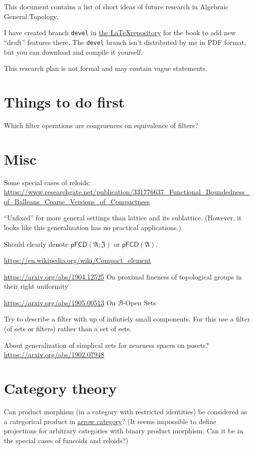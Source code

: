 \documentclass{amsart}
\begin{document}
This document contains a list of short ideas of future research in Algebraic
General Topology.

I have created branch \texttt{devel} in \href{https://bitbucket.org/portonv/algebraic-general-topology}{the \LaTeX repository} for the book
to add new ``draft'' features there. The \texttt{devel} branch isn't distributed by me in PDF format, but you can download and compile it yourself.

This research plan is not formal and may contain vague statements.

\section{Things to do first}

Which filter operations are congruences on
equivalence of filters?

\section{Misc}

Some special cases of reloids:
\url{https://www.researchgate.net/publication/331776637_Functional_Boundedness_of_Balleans_Coarse_Versions_of_Compactness}

``Unfixed'' for more general settings than lattice and its
sublattice. (However, it looks like this generalization has
no practical applications.)

Should clearly denote $\mathsf{pFCD}(\mathfrak{A};\mathfrak{Z})$ or $\mathsf{pFCD}(\mathfrak{A})$.

\url{https://en.wikipedia.org/wiki/Compact_element}

\url{https://arxiv.org/abs/1904.12525} On proximal fineness of topological groups in their right uniformity

\url{https://arxiv.org/abs/1905.00513}
On $\mathcal{B}$-Open Sets

Try to describe a filter with up of infintiely small
components.
For this use a filter (of sets or filters) rather than a set
of sets.

About generalization of simplical sets for nearness spaces on posets?
\url{https://arxiv.org/abs/1902.07948}

\section{Category theory}

Can product morphism (in a category with restricted
identities) be considered as a categorical product
in \href{https://en.wikipedia.org/wiki/Comma_category#Arrow_category}{arrow category}?
(It seems impossible to define projections for
arbitrary categories with binary product morphism.
Can it be in the special cases of funcoids and reloids?)
\end{document}
